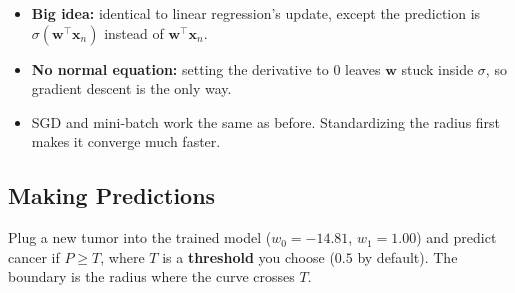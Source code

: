 \begin{itemize}
  \item \textbf{Big idea:} identical to linear regression's update, except the prediction is $\sigma(\mathbf{w}^\top\mathbf{x}_n)$ instead of $\mathbf{w}^\top\mathbf{x}_n$.
  \item \textbf{No normal equation:} setting the derivative to 0 leaves $\mathbf{w}$ stuck inside $\sigma$, so gradient descent is the only way.
  \item SGD and mini-batch work the same as before. Standardizing the radius first makes it converge much faster.
\end{itemize}
\subsection*{Making Predictions}
\begin{keeptogether}
Plug a new tumor into the trained model ($w_0 = -14.81$, $w_1 = 1.00$) and predict cancer if $P \ge T$, where $T$ is a \textbf{threshold} you choose ($0.5$ by default). The boundary is the radius where the curve crosses $T$.


\end{keeptogether}
